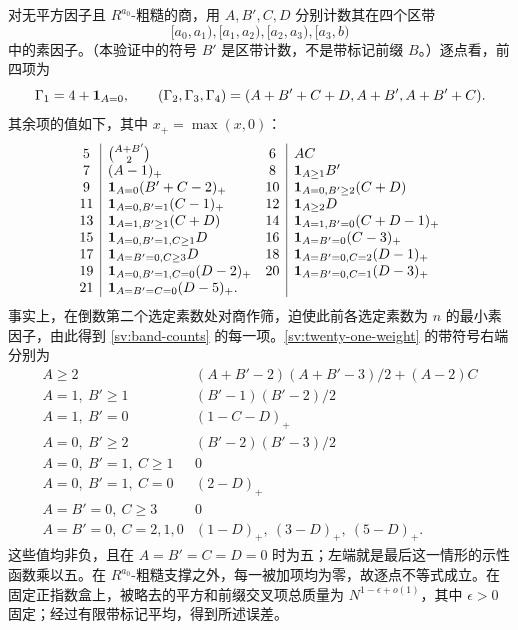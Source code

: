 对无平方因子且 $R^{a_0}$-粗糙的商，用 $A,B',C,D$ 分别计数其在四个区带
\[
[a_0,a_1),[a_1,a_2),[a_2,a_3),[a_3,b)
\]
中的素因子。（本验证中的符号 $B'$ 是区带计数，不是带标记前缀 $B$。）逐点看，前四项为
\[
 \Gamma_1=4+\mathbf 1_{A=0},\qquad
 (\Gamma_2,\Gamma_3,\Gamma_4)
       =(A+B'+C+D,A+B',A+B'+C).
\]
其余项的值如下，其中 $x_+=\max(x,0)$：
\begin{equation}\label{sv:band-counts}
\begin{array}{c|l@{\quad}c|l}
5&\binom{A+B'}2&6&AC\\
7&(A-1)_+&8&\one_{A\ge1}B'\\
9&\one_{A=0}(B'+C-2)_+
 &10&\one_{A=0,B'\ge2}(C+D)\\
11&\one_{A=0,B'=1}(C-1)_+
 &12&\one_{A\ge2}D\\
13&\one_{A=1,B'\ge1}(C+D)
 &14&\one_{A=1,B'=0}(C+D-1)_+\\
15&\one_{A=0,B'=1,C\ge1}D
 &16&\one_{A=B'=0}(C-3)_+\\
17&\one_{A=B'=0,C\ge3}D
 &18&\one_{A=B'=0,C=2}(D-1)_+\\
19&\one_{A=0,B'=1,C=0}(D-2)_+
 &20&\one_{A=B'=0,C=1}(D-3)_+\\
21&\one_{A=B'=C=0}(D-5)_+.&&
\end{array}
\end{equation}
事实上，在倒数第二个选定素数处对商作筛，迫使此前各选定素数为 $n$ 的最小素因子，由此得到 \eqref{sv:band-counts} 的每一项。\eqref{sv:twenty-one-weight} 的带符号右端分别为
\[
\begin{array}{c|l}
A\ge2&(A+B'-2)(A+B'-3)/2+(A-2)C\\
A=1,\ B'\ge1&(B'-1)(B'-2)/2\\
A=1,\ B'=0&(1-C-D)_+\\
A=0,\ B'\ge2&(B'-2)(B'-3)/2\\
A=0,\ B'=1,\ C\ge1&0\\
A=0,\ B'=1,\ C=0&(2-D)_+\\
A=B'=0,\ C\ge3&0\\
A=B'=0,\ C=2,1,0&(1-D)_+,\ (3-D)_+,\ (5-D)_+.
\end{array}
\]
这些值均非负，且在 $A=B'=C=D=0$ 时为五；左端就是最后这一情形的示性函数乘以五。在 $R^{a_0}$-粗糙支撑之外，每一被加项均为零，故逐点不等式成立。在固定正指数盒上，被略去的平方和前缀交叉项总质量为 $N^{1-\epsilon+o(1)}$，其中 $\epsilon>0$ 固定；经过有限带标记平均，得到所述误差。

